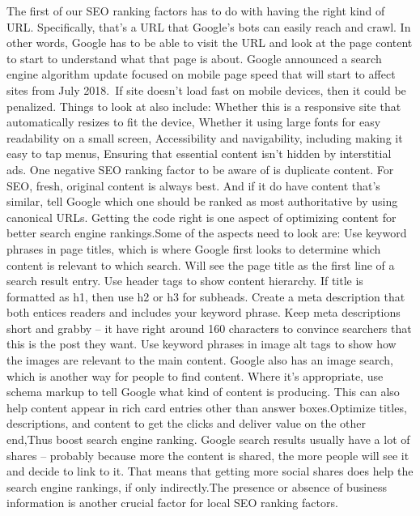 \documentclass{fisatproject}
\begin{document}
The first of our SEO ranking factors has to do with having the right kind of URL. Specifically, that’s a URL that Google’s bots can easily reach and crawl.\newline
In other words, Google has to be able to visit the URL and look at the page content to start to understand what that page is about. Google announced a search engine algorithm update focused on mobile page speed that will start to affect sites from July 2018. If site doesn’t load fast on mobile devices, then it could be penalized.\newline
Things to look at  also include:
Whether this is a responsive site that automatically resizes to fit the device,
Whether it using large fonts for easy readability on a small screen,
Accessibility and navigability, including making it easy to tap menus,
Ensuring that essential content isn’t hidden by interstitial ads.\newline
One negative SEO ranking factor to be aware of is duplicate content. For SEO, fresh, original content is always best. And if it do have content that’s similar, tell Google which one should be ranked as most authoritative by using canonical URLs.
Getting the code right is one aspect of optimizing content for better search engine rankings.\newline Some of the aspects need to look are:
Use keyword phrases in page titles, which is where Google first looks to determine which content is relevant to which search. Will see the page title as the first line of a search result entry.
Use header tags to show content hierarchy. If title is formatted as h1, then use h2 or h3 for subheads.
Create a meta description that both entices readers and includes your keyword phrase. Keep meta descriptions short and grabby – it have right around 160 characters to convince searchers that this is the post they want.\newline
Use keyword phrases in image alt tags to show how the images are relevant to the main content. Google also has an image search, which is another way for people to find content.\newline
Where it’s appropriate, use schema markup to tell Google what kind of content is producing. This can also help content appear in rich card entries other than answer boxes.Optimize titles, descriptions, and content to get the clicks and deliver value on the other end,Thus boost search engine ranking.\newline
Google search results usually have a lot of shares – probably because more the content is shared, the more people will see it and decide to link to it. That means that getting more social shares does help the search engine rankings, if only indirectly.The presence or absence of business information is another crucial factor for local SEO ranking factors.
\end{document}
